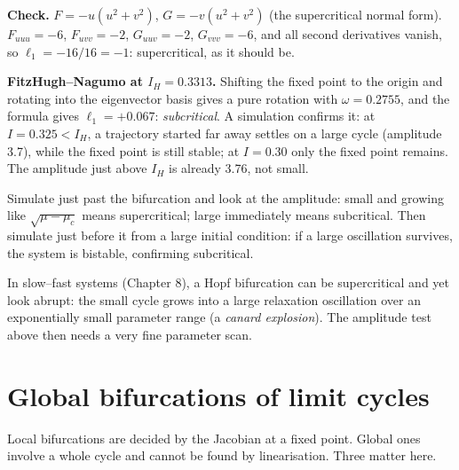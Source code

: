 \documentclass[11pt,openany]{report}
\begin{document}
\begin{worked}
\textbf{Check.} $F = -u(u^2+v^2)$, $G = -v(u^2+v^2)$ (the supercritical normal form). $F_{uuu} = -6$, $F_{uvv} = -2$,
$G_{uuv}=-2$, $G_{vvv}=-6$, and all second derivatives vanish, so $\ell_1 = -16/16 = -1$: supercritical, as it should be.

\textbf{FitzHugh--Nagumo at $I_H = 0.3313$.} Shifting the fixed point to the origin and rotating into the eigenvector
basis gives a pure rotation with $\omega = 0.2755$, and the formula gives $\ell_1 = +0.067$: \emph{subcritical}. A
simulation confirms it: at $I = 0.325 < I_H$, a trajectory started far away settles on a large cycle (amplitude 3.7),
while the fixed point is still stable; at $I = 0.30$ only the fixed point remains. The amplitude just above $I_H$ is
already 3.76, not small.
\end{worked}

\begin{recipe}
Simulate just past the bifurcation and look at the amplitude: small and growing like $\sqrt{\mu-\mu_c}$ means
supercritical; large immediately means subcritical. Then simulate just before it from a large initial condition: if a
large oscillation survives, the system is bistable, confirming subcritical.
\end{recipe}

\begin{pitfall}
In slow--fast systems (Chapter 8), a Hopf bifurcation can be supercritical and yet look abrupt: the small cycle grows
into a large relaxation oscillation over an exponentially small parameter range (a \emph{canard explosion}). The
amplitude test above then needs a very fine parameter scan.
\end{pitfall}

\chapter{Global bifurcations of limit cycles}
Local bifurcations are decided by the Jacobian at a fixed point. Global ones involve a whole cycle and cannot be found
by linearisation. Three matter here.
\end{document}
